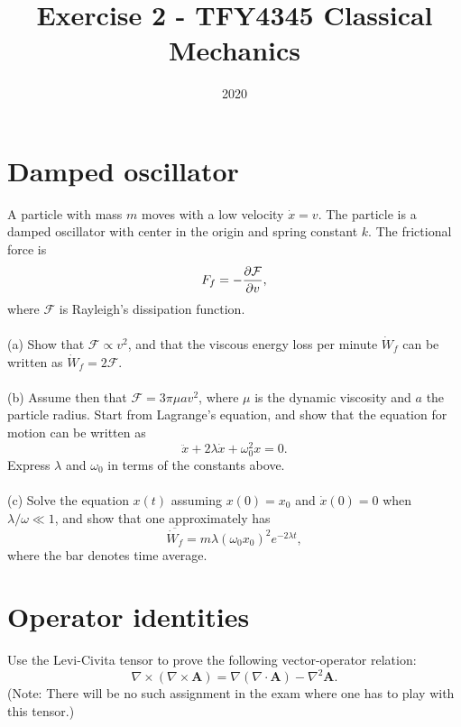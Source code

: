 \documentclass{article}
\title{Exercise 2 - TFY4345 Classical Mechanics}
\date{2020}
\begin{document}
    \maketitle
    \section{Damped oscillator}
        A particle with mass $m$ moves with a low velocity $\dot x = v$. The particle is a damped oscillator with center in the origin and spring constant $k$. The frictional force is 
        \begin{equation*}
            F_f = - \pdv{\mathcal{F}}{v},
        \end{equation*}
        where $\mathcal{F}$ is Rayleigh's dissipation function. \\ \\
        (a) Show that $\mathcal{F} \propto v^2$, and that the viscous energy loss per minute $\dot W_f$ can be written as $\dot W_f = 2 \mathcal{F}$. \\ \\
        (b) Assume then that $\mathcal{F} = 3 \pi \mu a v^2$, where $\mu$ is the dynamic viscosity and $a$ the particle radius. Start from Lagrange's equation, and show that the equation for motion can be written as 
        \begin{equation*}
            \ddot x + 2 \lambda \dot x + \omega^2_0 x = 0.
        \end{equation*}
        Express $\lambda$ and $\omega_0$ in terms of the constants above. \\ \\
        (c) Solve the equation $x(t)$ assuming $x(0) = x_0$ and $\dot x(0) = 0$ when $\lambda / \omega \ll 1$, and show that one approximately has 
        \begin{equation*}
            \overline{\dot W_f} = m \lambda \left(\omega_0 x_0\right)^2 e^{-2 \lambda t},
        \end{equation*}
        where the bar denotes time average.
        

    \section{Operator identities}
        Use the Levi-Civita tensor to prove the following vector-operator relation:
        \begin{equation*}
            \nabla \times \left( \nabla \times \mathbf{A} \right) = \nabla \left(\nabla \cdot \mathbf{A}\right) - \nabla^2 \mathbf{A}.
        \end{equation*}
        (Note: There will be no such assignment in the exam where one has to play with this tensor.)
\end{document}
